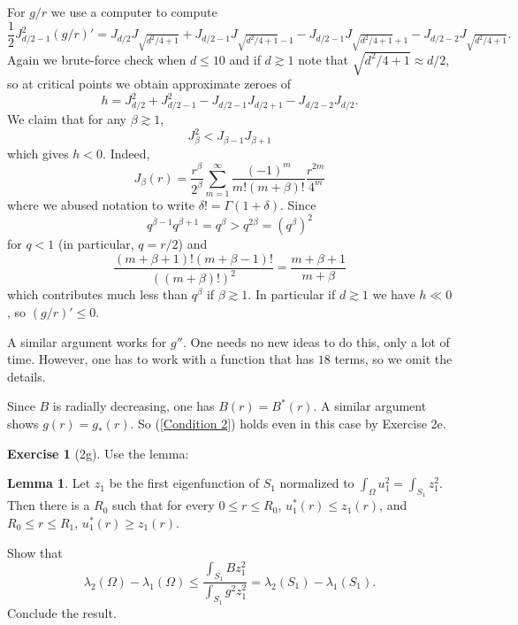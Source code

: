 \documentclass[10pt]{article}
\theoremstyle{definition}
\newtheorem{exer}{Exercise}
\newtheorem{lemma}{Lemma}[exer]
\begin{document}
For $g/r$ we use a computer to compute
$$\frac{1}{2} J_{d/2-1}^2 (g/r)' = J_{d/2}J_{\sqrt{d^2/4 + 1}} + J_{d/2 - 1} J_{\sqrt{d^2/4 + 1} - 1} - J_{d/2 - 1} J_{\sqrt{d^2/4 + 1} + 1} - J_{d/2-2}J_{\sqrt{d^2/4 + 1}}.$$
Again we brute-force check when $d \leq 10$ and if $d \gtrsim 1$ note that $\sqrt{d^2/4+1} \approx d/2$, so at critical points we obtain approximate zeroes of
$$h = J_{d/2}^2 + J_{d/2-1}^2 - J_{d/2-1} J_{d/2+1} - J_{d/2-2} J_{d/2}.$$
We claim that for any $\beta \gtrsim 1$,
$$J_\beta^2 < J_{\beta - 1} J_{\beta + 1}$$
which gives $h < 0$. Indeed,
$$J_\beta(r) = \frac{r^\beta}{2^\beta} \sum_{m=1}^\infty \frac{(-1)^m}{m!(m+\beta)!}\frac{r^{2m}}{4^m}$$
where we abused notation to write $\delta! = \Gamma(1 + \delta)$. Since
$$q^{\beta - 1}q^{\beta + 1} = q^\beta > q^{2\beta} = (q^\beta)^2$$
for $q < 1$ (in particular, $q = r/2$) and
$$\frac{(m+\beta+1)!(m+\beta-1)!}{((m+\beta)!)^2} = \frac{m+\beta+1}{m+\beta}$$
which contributes much less than $q^\beta$ if $\beta \gtrsim 1$.
In particular if $d \gtrsim 1$ we have $h \ll 0$, so $(g/r)' \leq 0$.

A similar argument works for $g''$.
One needs no new ideas to do this, only a lot of time.
However, one has to work with a function that has $18$ terms, so we omit the details.

Since $B$ is radially decreasing, one has $B(r) = B^*(r)$.
A similar argument shows $g(r) = g_*(r)$.
So (\ref{Condition 2}) holds even in this case by Exercise 2e.

\begin{exer}[2g]
Use the lemma:
\begin{lemma}
Let $z_1$ be the first eigenfunction of $S_1$ normalized to $\int_\Omega u_1^2 = \int_{S_1} z_1^2$.
Then there is a $R_0$ such that for every $0 \leq r \leq R_0$, $u_1^*(r) \leq z_1(r)$, and $R_0 \leq r \leq R_1$, $u_1^*(r) \geq z_1(r)$.
\end{lemma}
Show that
$$
\lambda_2(\Omega) - \lambda_1(\Omega) \leq \frac{\int_{S_1} Bz_1^2}{\int_{S_1} g^2 z_1^2} = \lambda_2(S_1) - \lambda_1(S_1).
$$
Conclude the result.
\end{exer}
\end{document}
